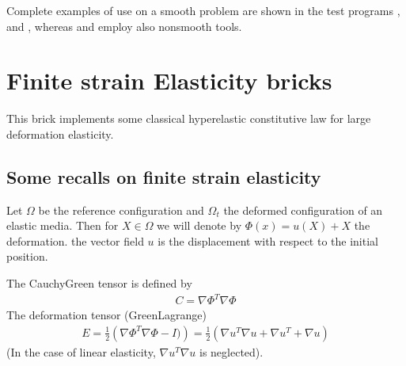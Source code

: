 \documentclass[a4paper,11pt,english]{sphinxmanual}
\begin{document}
Complete examples of use on a smooth problem are shown in the test programs
, 
and , whereas
 and
 employ also
non\sphinxhyphen{}smooth tools.

\ignorespaces 

\chapter{Finite strain Elasticity bricks}
\label{\detokenize{userdoc/model_nonlinear_elasticity:finite-strain-elasticity-bricks}}\label{\detokenize{userdoc/model_nonlinear_elasticity:ud-model-nonlinear-elasticity}}\label{\detokenize{userdoc/model_nonlinear_elasticity:index-0}}\label{\detokenize{userdoc/model_nonlinear_elasticity::doc}}
This brick implements some classical hyperelastic constitutive law for large deformation elasticity.


\section{Some recalls on finite strain elasticity}
\label{\detokenize{userdoc/model_nonlinear_elasticity:some-recalls-on-finite-strain-elasticity}}
Let \(\Omega\) be the reference configuration and \(\Omega_t\) the deformed configuration of an elastic media. Then for \(X \in \Omega\) we will denote by \(\Phi(x) = u(X) + X\) the deformation. the vector field \(u\) is the displacement with respect to the initial position.

The Cauchy\sphinxhyphen{}Green tensor is defined by
\begin{equation*}
\begin{split}C = \nabla\Phi^T\nabla\Phi\end{split}
\end{equation*}
The deformation tensor (Green\sphinxhyphen{}Lagrange)
\begin{equation*}
\begin{split}E = \frac{1}{2}\left(\nabla\Phi^T\nabla\Phi - I)\right)
  = \frac{1}{2}\left({\nabla u^T}{\nabla u} + {\nabla u^T} + {\nabla u}\right)\end{split}
\end{equation*}
(In the case of linear elasticity, \({\nabla u^T}{\nabla u}\) is neglected).
\end{document}
